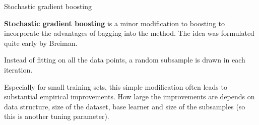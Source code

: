 \begin{vbframe}{Stochastic gradient boosting}

\textbf{Stochastic gradient boosting} is a minor modification to boosting to
incorporate the advantages of bagging into the method.
The idea was formulated quite early by Breiman.

\lz

Instead of fitting on all the data points, a random subsample is drawn in each iteration.

\lz

Especially for small training sets, this simple modification often leads to
substantial empirical improvements.
How large the improvements are depends on data structure, size of the dataset,
base learner and size of the subsamples (so this is another tuning parameter).


\end{vbframe}















